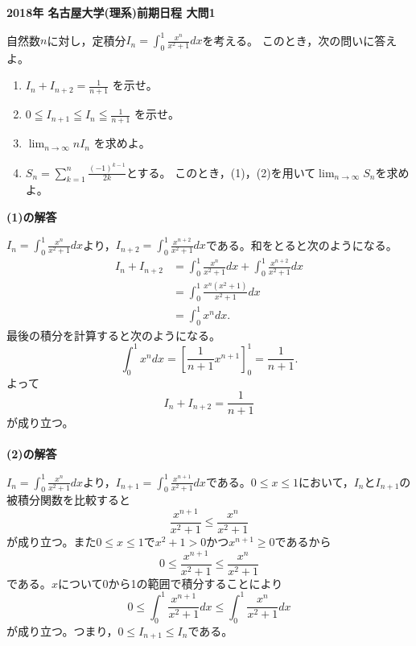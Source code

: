 \documentclass[11pt,a4paper]{jsarticle}
\begin{document}
\noindent
{\bf 2018年 名古屋大学(理系)前期日程 大問1}

\vspace{5mm}
自然数$n$に対し，定積分$\displaystyle I_{n}=\int_{0}^{1} \frac{x^{n}}{x^{2}+1} d x$を考える。
このとき，次の問いに答えよ。
\begin{enumerate}[(1)]
 \item $\displaystyle I_{n}+I_{n+2}=\frac{1}{n+1}$ を示せ。
 \item $\displaystyle 0 \leqq I_{n+1} \leqq I_{n} \leqq \frac{1}{n+1}$ を示せ。
 \vspace{2mm}
 \item $\displaystyle \lim _{n \rightarrow \infty} n I_{n}$ を求めよ。
 \item $\displaystyle S_{n}=\sum_{k=1}^{n} \frac{(-1)^{k-1}}{2 k}$とする。
 このとき，(1)，(2)を用いて$\displaystyle \lim _{n \rightarrow \infty} S_{n}$を求めよ。
\end{enumerate}

\vspace{20mm}
\noindent
{\bf (1)の解答}

$\displaystyle I_{n}=\int_{0}^{1} \frac{x^{n}}{x^{2}+1} d x$より，$\displaystyle I_{n+2}=\int_{0}^{1} \frac{x^{n+2}}{x^{2}+1} d x$である。和をとると次のようになる。
\[\begin{aligned}
  I_{n}+I_{n+2} &=\int_{0}^{1} \frac{x^{n}}{x^{2}+1} d x+\int_{0}^{1} \frac{x^{n+2}}{x^{2}+1} d x \\
  &=\int_{0}^{1} \frac{x^{n}\left(x^{2}+1\right)}{x^{2}+1} d x \\
  &=\int_{0}^{1} x^{n} d x.
\end{aligned}\]
最後の積分を計算すると次のようになる。
\[\int_{0}^{1} x^{n} d x=\left[\frac{1}{n+1} x^{n+1}\right]_{0}^{1}=\frac{1}{n+1}.\]
よって
\[I_{n}+I_{n+2}=\frac{1}{n+1}\]
が成り立つ。
\\
\\
{\bf (2)の解答}

$\displaystyle I_{n}=\int_{0}^{1} \frac{x^{n}}{x^{2}+1} d x$より，$\displaystyle I_{n+1}=\int_{0}^{1} \frac{x^{n+1}}{x^{2}+1} d x$である。$0\leq x\leq 1$において，$I_n$と$I_{n+1}$の被積分関数を比較すると
\[\frac{x^{n+1}}{x^{2}+1} \leq \frac{x^{n}}{x^{2}+1}\]
が成り立つ。また$0\leq x\leq 1$で$x^2+1>0$かつ$x^{n+1}\geq 0$であるから
\[0 \leq \frac{x^{n+1}}{x^{2}+1} \leq \frac{x^{n}}{x^{2}+1}\]
である。$x$について0から1の範囲で積分することにより
\[0 \leq \int_{0}^{1} \frac{x^{n+1}}{x^{2}+1} d x \leq \int_{0}^{1} \frac{x^{n}}{x^{2}+1} d x\]
が成り立つ。つまり，$0\leq I_{n+1}\leq I_{n}$である。
\end{document}
